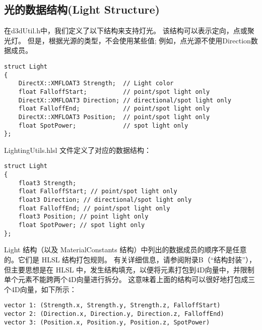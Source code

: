 \subsection{光的数据结构(Light Structure)}
\begin{flushleft}
在d3dUtil.h中，我们定义了以下结构来支持灯光。 该结构可以表示定向，点或聚光灯。 但是，根据光源的类型，不会使用某些值; 例如，点光源不使用Direction数据成员。\\
\end{flushleft}

\begin{lstlisting}
struct Light
{
    DirectX::XMFLOAT3 Strength;  // Light color
    float FalloffStart;          // point/spot light only
    DirectX::XMFLOAT3 Direction; // directional/spot light only
    float FalloffEnd;            // point/spot light only
    DirectX::XMFLOAT3 Position;  // point/spot light only
    float SpotPower;             // spot light only
};
\end{lstlisting}

\begin{flushleft}
LightingUtils.hlsl 文件定义了对应的数据结构：\\
\end{flushleft}

\begin{lstlisting}
struct Light
{
    float3 Strength;
    float FalloffStart; // point/spot light only
    float3 Direction; // directional/spot light only
    float FalloffEnd; // point/spot light only
    float3 Position; // point light only
    float SpotPower; // spot light only
};
\end{lstlisting}

\begin{flushleft}
Light 结构（以及 MaterialConstants 结构）中列出的数据成员的顺序不是任意的。它们是 HLSL 结构打包规则。 有关详细信息，请参阅附录B（“结构封装”），但主要思想是在 HLSL 中，发生结构填充，以便将元素打包到4D向量中，并限制单个元素不能跨两个4D向量进行拆分。 这意味着上面的结构可以很好地打包成三个4D向量，如下所示：\\
\end{flushleft}

\begin{lstlisting}
vector 1: (Strength.x, Strength.y, Strength.z, FalloffStart)
vector 2: (Direction.x, Direction.y, Direction.z, FalloffEnd)
vector 3: (Position.x, Position.y, Position.z, SpotPower)
\end{lstlisting}

